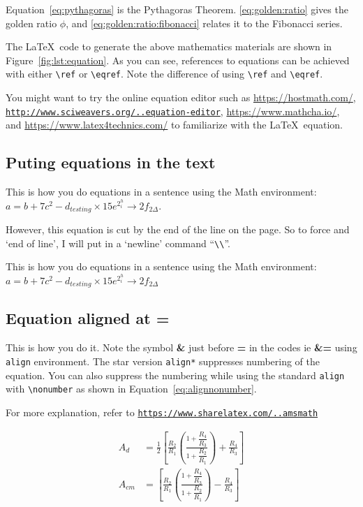 Equation~\ref{eq:pythagoras} is the Pythagoras Theorem. \eqref{eq:golden:ratio} gives the golden ratio $\phi$, and \eqref{eq:golden:ratio:fibonacci} relates it to the Fibonacci series. 

The \LaTeX\ code to generate the above mathematics materials are shown in Figure~\ref{fig:lst:equation}.  As you can see, references to equations can be achieved with either \verb|\ref| or \verb|\eqref|. Note the difference of using \verb|\ref| and \verb|\eqref|. 

You might want to try the online equation editor such as  \url{https://hostmath.com/}, \href{http://www.sciweavers.org/free-online-latex-equation-editor}{\texttt{http://www.sciweavers.org/..equation-editor}}, \url{https://www.mathcha.io/}, and \url{https://www.latex4technics.com/} to familiarize with the \LaTeX\ equation. 

\subsection{Puting equations in the text~~}  This is how you do equations in a sentence using the Math environment:  $a=b+7c^2 - d_{testing} \times 15e^{2^{h}_i} \rightarrow 2f_{2\Delta}$.  

However, this equation is cut by the end of the line on the page.  So to force and `end of line', I will put in a `newline' command ``\verb|\\|''.  

This is how you do equations in a sentence using the Math environment: \\ $a=b+7c^2 - d_{testing} \times 15e^{2^{h}_i} \rightarrow 2f_{2\Delta}$ \\

\subsection{Equation aligned at =}
This is how you do it. Note the symbol \textbf{\&} just before \textbf{=} in the codes ie \textbf{\&=} using \verb|align| environment. The star version \verb|align*| suppresses numbering of the equation. You can also suppress the numbering while using the standard \verb|align| with \verb|\nonumber| as shown in Equation~\eqref{eq:alignnonumber}.  

For more explanation, refer to \href{https://www.sharelatex.com/learn/Aligning_equations_with_amsmath}{\texttt{https://www.sharelatex.com/..amsmath}}

\begin{align}
A_d &= \frac{1}{2}
\left[
\frac{R_2}{R_1}
\left(\frac
{1+\dfrac{R_4}{R_3}}
{1+\dfrac{R_2}{R_1}}
\right)
+\frac{R_4}{R_3}
\right] \nonumber \\ 	%
A_{cm} &= 
\left[
\frac{R_2}{R_1}
\left(\frac
{1+\dfrac{R_4}{R_3}}
{1+\dfrac{R_2}{R_1}}
\right)
-\frac{R_4}{R_3}
\right] \label{eq:alignnonumber} %
\end{align}

